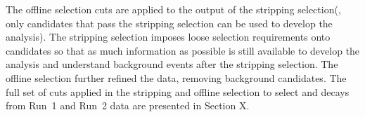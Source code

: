 The offline selection cuts are applied to the output of the stripping selection(, only candidates that pass the stripping selection can be used to develop the analysis). The stripping selection imposes loose selection requirements onto \bsmumu candidates so that as much information as possible is still available to develop the analysis and understand background events after the stripping selection. The offline selection further refined the data, removing background candidates. The full set of cuts applied in the stripping and offline selection to select \bsmumu and \bhh decays from Run~1 and Run~2 data are presented in Section X. 


 



